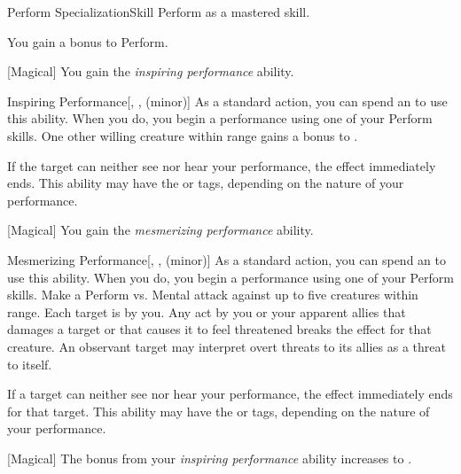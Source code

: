     \begin{feat}{Perform Specialization}{Skill}
        \featpre Perform as a mastered skill.

         You gain a  bonus to Perform.

        [Magical] You gain the \textit{inspiring performance} ability.
        \begin{ability}{Inspiring Performance}[, ,  (minor)]
            As a standard action, you can spend an  to use this ability.
            When you do, you begin a performance using one of your Perform skills.
            One other willing creature within \rngmed range gains a  bonus to .

            If the target can neither see nor hear your performance, the effect immediately ends.
            This ability may have the  or  tags, depending on the nature of your performance.
        \end{ability}

        [Magical] You gain the \textit{mesmerizing performance} ability.
        \begin{ability}{Mesmerizing Performance}[, ,  (minor)]
            As a standard action, you can spend an  to use this ability.
            When you do, you begin a performance using one of your Perform skills.
            Make a Perform vs. Mental attack against up to five creatures within \rngmed range.
            \hit Each target is \fascinated by you.
            Any act by you or your apparent allies that damages a target or that causes it to feel threatened breaks the effect for that creature.
            An observant target may interpret overt threats to its allies as a threat to itself.

            If a target can neither see nor hear your performance, the effect immediately ends for that target.
            This ability may have the  or  tags, depending on the nature of your performance.
        \end{ability}

        [Magical] The bonus from your \textit{inspiring performance} ability increases to .


\end{feat}

